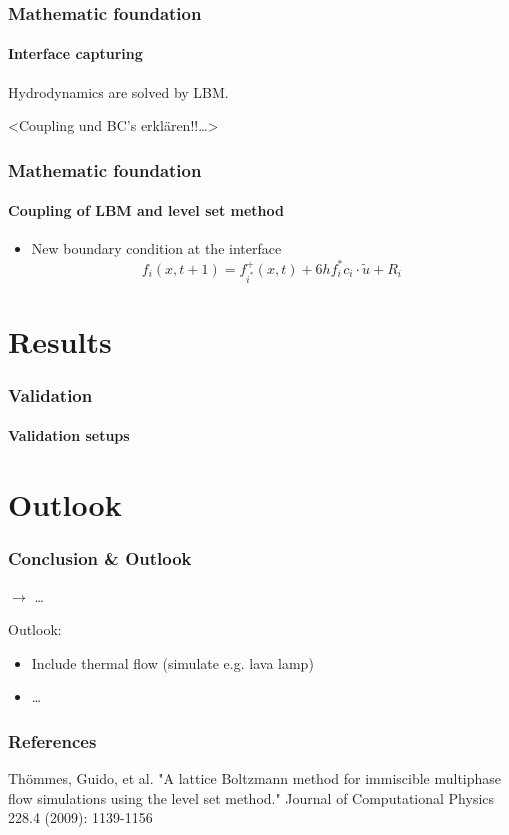 \documentclass[ucs]{beamer}
\begin{document}
\begin{frame}
\frametitle{Mathematic foundation}
\framesubtitle{Interface capturing}
Hydrodynamics are solved by LBM.

<Coupling und BC's erklären!!\ldots>
\end{frame}

\begin{frame}
\frametitle{Mathematic foundation}
\framesubtitle{Coupling of LBM and level set method}
\begin{itemize}
\item<1-> New boundary condition at the interface
$$f_i(x,t+1) = f_{i^*}^{+}(x,t) + 6hf_{i}^{*}c_i \cdot \tilde{u} + R_i$$
\end{itemize}
\end{frame}


\section{Results}
\begin{frame}
\frametitle{Validation}
\framesubtitle{Validation setups}
\end{frame}

\section{Outlook}
\begin{frame}
\frametitle{Conclusion \& Outlook}
$\rightarrow$ \dots

\vspace{.8cm}
Outlook:
\begin{itemize}
\item<1-> Include thermal flow (simulate e.g. lava lamp)
\item<2-> \dots
\end{itemize}

\end{frame}

\begin{frame}
\frametitle{References}
\begin{thebibliography}{etw}
     Thömmes, Guido, et al. "A lattice Boltzmann method for immiscible multiphase flow simulations using the level set method." Journal of Computational Physics 228.4 (2009): 1139-1156
\end{thebibliography}
\end{frame}
\end{document}
